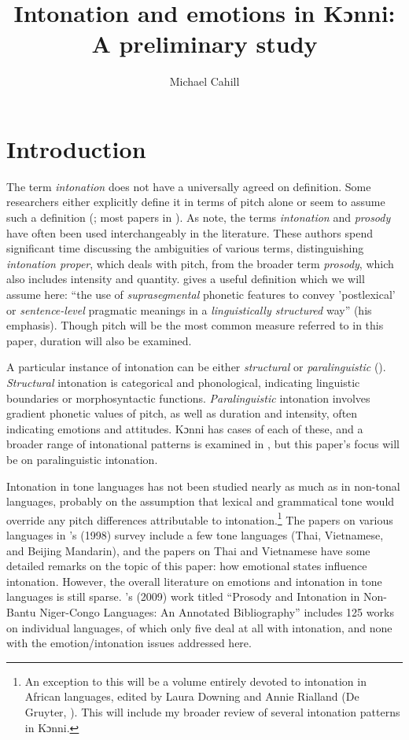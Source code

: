 \documentclass[output=paper]{langsci/langscibook}
\title{Intonation and emotions in Kɔnni: A preliminary study}
\author{%
 Michael Cahill\affiliation{Cahill affiliation} 
}
\begin{document}
\section{Introduction}
The term \emph{intonation} does not have a universally agreed on definition. Some researchers either explicitly define it in terms of pitch alone or seem to assume such a definition (\citealt{lieberman1967}; most papers in \citealt{bolinger1972,gussenhoven2004}). As \citet[3]{hirstdicristo1998} note, the terms \emph{intonation} and \emph{prosody} have often been used interchangeably in the literature. These authors spend significant time discussing the ambiguities of various terms, distinguishing \emph{intonation proper}, which deals with pitch, from the broader term \emph{prosody}, which also includes intensity and quantity. \citet[4]{ladd2008} gives a useful definition which we will assume here: ``the use of \emph{suprasegmental} phonetic features to convey 'postlexical' or \emph{sentence-level} pragmatic meanings in a \emph{linguistically structured} way'' (his emphasis). Though pitch will be the most common measure referred to in this paper, duration will also be examined. 

A particular instance of intonation can be either \emph{structural} or \emph{paralinguistic} (\citealt{gussenhoven2004,laddetal1986,ladd2008}). \emph{Structural} intonation is categorical and phonological, indicating linguistic boundaries or morphosyntactic functions. \emph{Paralinguistic} intonation involves gradient phonetic values of pitch, as well as duration and intensity, often indicating emotions and attitudes. Kɔnni has cases of each of these, and a broader range of intonational patterns is examined in \citet{cahillforth}, but this paper's focus will be on paralinguistic intonation.

Intonation in tone languages has not been studied nearly as much as in non-tonal languages, probably on the assumption that lexical and grammatical tone would override any pitch differences attributable to intonation.\footnote{An exception to this will be a volume entirely devoted to intonation in African languages, edited by Laura Downing and Annie Rialland (De Gruyter, \citeyear{downingriallandforth}). This will include my broader review of several intonation patterns in Kɔnni.} The papers on various languages in \citeauthor{hirstdicristo1998}'s (1998) survey include a few tone languages (Thai, Vietnamese, and Beijing Mandarin), and the papers on Thai and Vietnamese have some detailed remarks on the topic of this paper: how emotional states influence intonation. However, the overall literature on emotions and intonation in tone languages is still sparse. \citeauthor{green2009}'s (2009) work titled ``Prosody and Intonation in Non-Bantu Niger-Congo Languages: An Annotated Bibliography'' includes 125 works on individual languages, of which only five deal at all with intonation, and none with the emotion/intonation issues addressed here. 
\end{document}
